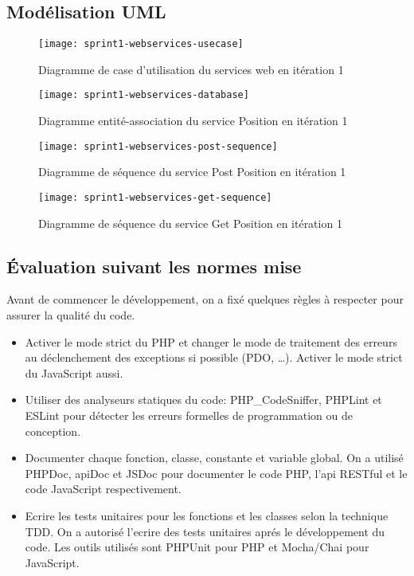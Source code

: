\subsection{Modélisation UML}

\begin{figure}[htbp]
    \centering
    \texttt{[image: sprint1-webservices-usecase]}
    \caption{Diagramme de case d'utilisation du services web en itération 1}
    \label{fig:sprint1-webservices-usecase}
\end{figure}

\begin{figure}[htbp]
    \centering
    \texttt{[image: sprint1-webservices-database]}
    \caption{Diagramme entité-association du service Position en itération 1}
\end{figure}

\begin{figure}[htbp]
    \centering
    \texttt{[image: sprint1-webservices-post-sequence]}
    \caption{Diagramme de séquence du service Post Position en itération 1}
    \label{fig:sprint1-webservices-post-sequence}
\end{figure}

\begin{figure}[htbp]
    \centering
    \texttt{[image: sprint1-webservices-get-sequence]}
    \caption{Diagramme de séquence du service Get Position en itération 1}
    \label{fig:sprint1-webservices-get-sequence}
\end{figure}

\subsection{Évaluation suivant les normes mise}
Avant de commencer le développement, on a fixé quelques règles à respecter pour
assurer la qualité du code.

\begin{itemize}
    \item Activer le mode strict du PHP et changer le mode de traitement des
        erreurs au déclenchement des exceptions si possible (PDO, \ldots).
        Activer le mode strict du JavaScript aussi.
    \item Utiliser des analyseurs statiques du code: PHP\_CodeSniffer, PHPLint et
        ESLint pour détecter les erreurs formelles de programmation ou de
        conception.
    \item Documenter chaque fonction, classe, constante et variable global. On
        a utilisé PHPDoc, apiDoc et JSDoc pour documenter le code PHP, l'api
        RESTful et le code JavaScript respectivement.
    \item Ecrire les tests unitaires pour les fonctions et les classes selon la
        technique \acrshort{TDD}. On a autorisé l'ecrire des tests unitaires
        aprés le développement du code. Les outils utilisés sont PHPUnit pour
        PHP et Mocha/Chai pour JavaScript.
\end{itemize}

